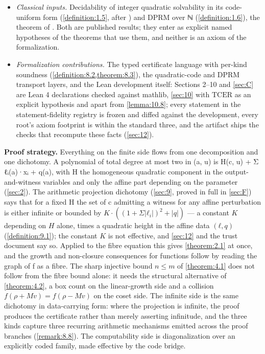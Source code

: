 \documentclass[11pt]{article}
\theoremstyle{plain}
\theoremstyle{definition}
\theoremstyle{remark}
\theoremstyle{plain}
\theoremstyle{definition}
\theoremstyle{remark}
\theoremstyle{plain}
\theoremstyle{definition}
\theoremstyle{remark}
\begin{document}
\begin{itemize}
\item \emph{Classical inputs.} Decidability of integer quadratic solvability in its code-uniform form (\cref{definition:1.5}, after \cite{GS04}) and DPRM over ℕ (\cref{definition:1.6}), the theorem of \cite{DPR61,Mat70}. Both are published results; they enter as explicit named hypotheses of the theorems that use them, and neither is an axiom of the formalization.
\item \emph{Formalization contributions.} The typed certificate language with per-kind soundness (\cref{definition:8.2,theorem:8.3}), the quadratic-code and DPRM transport layers, and the Lean development itself: Sections 2–10 and \cref{sec:C} are Lean 4 declarations checked against mathlib, \cref{sec:10} with $\mathrm{TCER}$ as an explicit hypothesis and apart from \cref{lemma:10.8}; every statement in the statement-fidelity registry is frozen and diffed against the development, every root's axiom footprint is within the standard three, and the artifact ships the checks that recompute these facts (\cref{sec:12}).
\end{itemize}

\textbf{Proof strategy.} Everything on the finite side flows from one decomposition and one dichotomy. A polynomial of total degree at most two in (a, u) is H(c, u) + Σ ℓᵢ(a)·xᵢ + q(a), with H the homogeneous quadratic component in the output-and-witness variables and only the affine part depending on the parameter (\cref{sec:2}). The arithmetic projection dichotomy (\cref{sec:9}, proved in full in \cref{sec:F}) says that for a fixed H the set of c admitting a witness for any affine perturbation is either infinite or bounded by $K·((1 + Σ|ℓ_{i}|)^{2} + |q|)$ — a constant $K$ depending on $H$ alone, times a quadratic height in the affine data $(ℓ, q)$ (\cref{definition:9.1}); the constant $K$ is not effective, and \cref{sec:12} and the trust document say so. Applied to the fibre equation this gives \cref{theorem:2.1} at once, and the growth and non-closure consequences for functions follow by reading the graph of f as a fibre. The sharp injective bound $n ≤ m$ of \cref{theorem:4.1} does not follow from the fibre bound alone: it needs the structural alternative of \cref{theorem:4.2}, a box count on the linear-growth side and a collision $f(ρ + Mv) = f(ρ − Mv)$ on the coset side. The infinite side is the same dichotomy in data-carrying form: where the projection is infinite, the proof produces the certificate rather than merely asserting infinitude, and the three kinds capture three recurring arithmetic mechanisms emitted across the proof branches (\cref{remark:8.8}). The computability side is diagonalization over an explicitly coded family, made effective by the code bridge.
\end{document}
